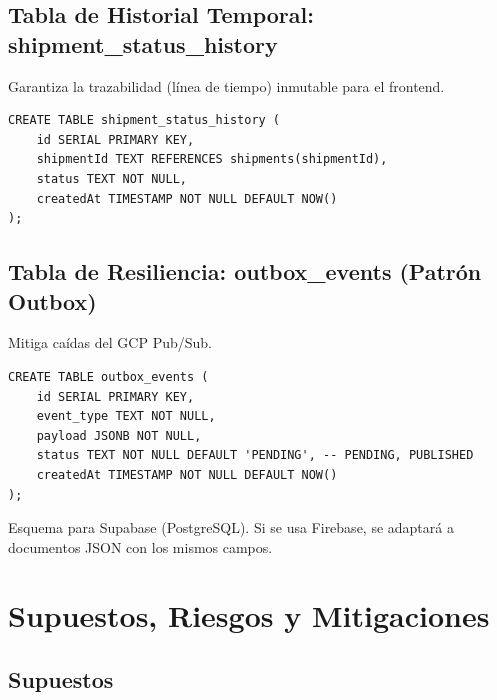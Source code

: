 \documentclass[11pt, a4paper]{article}
\begin{document}
\subsection{Tabla de Historial Temporal: shipment\_status\_history}
Garantiza la trazabilidad (línea de tiempo) inmutable para el frontend.

\begin{lstlisting}
CREATE TABLE shipment_status_history (
    id SERIAL PRIMARY KEY,
    shipmentId TEXT REFERENCES shipments(shipmentId),
    status TEXT NOT NULL,
    createdAt TIMESTAMP NOT NULL DEFAULT NOW()
);
\end{lstlisting}

\subsection{Tabla de Resiliencia: outbox\_events (Patrón Outbox)}
Mitiga caídas del GCP Pub/Sub.

\begin{lstlisting}
CREATE TABLE outbox_events (
    id SERIAL PRIMARY KEY,
    event_type TEXT NOT NULL,
    payload JSONB NOT NULL,
    status TEXT NOT NULL DEFAULT 'PENDING', -- PENDING, PUBLISHED
    createdAt TIMESTAMP NOT NULL DEFAULT NOW()
);
\end{lstlisting}

\begin{infobox}
  Esquema para Supabase (PostgreSQL). Si se usa Firebase,
  se adaptará a documentos JSON con los mismos campos.
\end{infobox}


\section{Supuestos, Riesgos y Mitigaciones}

\subsection{Supuestos}
\end{document}

